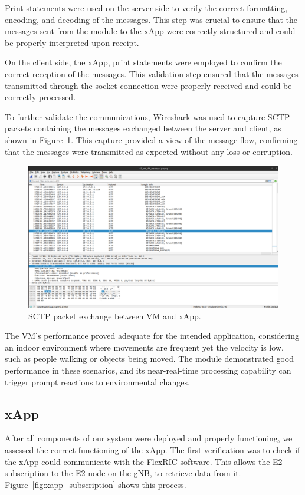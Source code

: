 Print statements were used on the server side to verify the correct formatting, encoding, and decoding of the messages.
This step was crucial to ensure that the messages sent from the module to the xApp were correctly structured and could be properly interpreted upon receipt.

On the client side, the xApp, print statements were employed to confirm the correct reception of the messages.
This validation step ensured that the messages transmitted through the socket connection were properly received and could be correctly processed.

To further validate the communications, Wireshark was used to capture SCTP packets containing the messages exchanged between the server and client, as shown in Figure~\ref{fig:capture_messages}.
This capture provided a view of the message flow, confirming that the messages were transmitted as expected without any loss or corruption.

\begin{figure}[H]
    \centering
    \includegraphics[width=0.8\linewidth]{figures/vm_xapp}
    \caption[SCTP packet exchange between VM and xApp]{SCTP packet exchange between VM and xApp.}
    \label{fig:capture_messages}
\end{figure}

The VM's performance proved adequate for the intended application, considering an indoor environment where movements are frequent yet the velocity is low, such as people walking or objects being moved.
The module demonstrated good performance in these scenarios, and its near-real-time processing capability can trigger prompt reactions to environmental changes.

\subsection{xApp}\label{subsec:mm_xapp}
After all components of our system were deployed and properly functioning, we assessed the correct functioning of the xApp.
The first verification was to check if the xApp could communicate with the FlexRIC software.
This allows the E2 subscription to the E2 node on the gNB, to retrieve data from it.
Figure~\ref{fig:xapp_subscription} shows this process.

